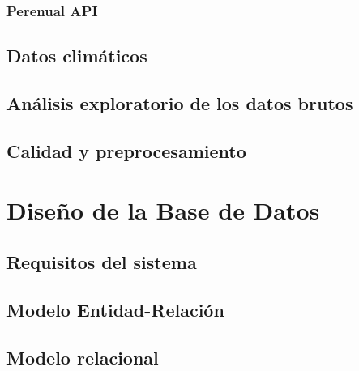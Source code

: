 \documentclass[12pt, a4paper]{article}
\begin{document}
\subsubsection{Perenual API}

\subsection{Datos climáticos}

\subsection{Análisis exploratorio de los datos brutos}

\subsection{Calidad y preprocesamiento}

\section{Diseño de la Base de Datos}
\label{sec:bbdd}

\subsection{Requisitos del sistema}

\subsection{Modelo Entidad-Relación}

\subsection{Modelo relacional}
\end{document}
